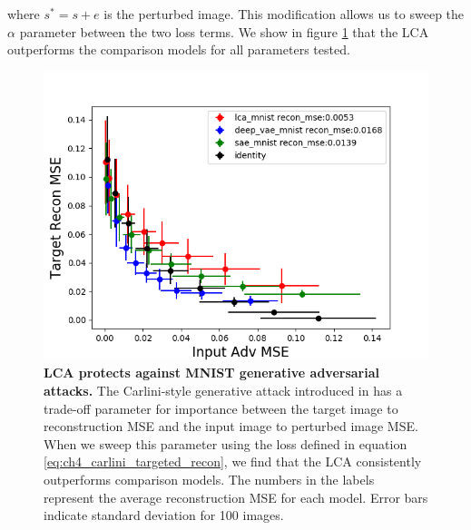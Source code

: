 \noindent where $s^{*}=s+e$ is the perturbed image. This modification allows us to sweep the $\alpha$ parameter between the two loss terms. We show in figure \ref{fig:ch4_kos_generative_attack} that the LCA outperforms the comparison models for all parameters tested.

\begin{figure}[h]
    \begin{center}
    \centerline{\includegraphics[width=\columnwidth]{figures/recon_mult_tradeoff.png}}
    \end{center}
    \caption{\textbf{LCA protects against MNIST generative adversarial attacks.} The Carlini-style generative attack introduced in \parencite{kos2018adversarial} has a trade-off parameter for importance between the target image to reconstruction MSE and the input image to perturbed image MSE. When we sweep this parameter using the loss defined in equation \eqref{eq:ch4_carlini_targeted_recon}, we find that the LCA consistently outperforms comparison models. The numbers in the labels represent the average reconstruction MSE for each model. Error bars indicate standard deviation for 100 images.}
    \label{fig:ch4_kos_generative_attack}
\end{figure}


